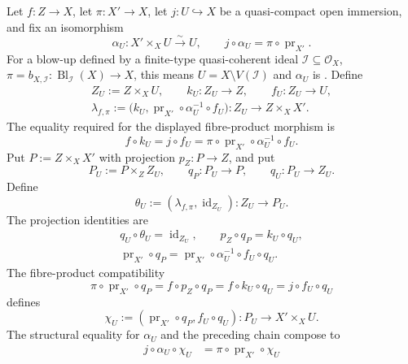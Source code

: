 \begin{definition}
  \label{def:nagata-strict-transform}
  \lean{}

  Let $f\colon Z\to X$, let $\pi\colon X'\to X$, let
  $j\colon U\hookrightarrow X$ be a quasi-compact open immersion, and fix
  an isomorphism
  \[
    \alpha_U\colon X'\times_XU\xrightarrow{\sim}U,\qquad
    j\circ\alpha_U=\pi\circ\operatorname{pr}_{X'}.
  \]
  For a blow-up defined by a finite-type quasi-coherent ideal
  $\mathcal I\subseteq\mathcal O_X$,
  $\pi=b_{X,\mathcal I}\colon\operatorname{Bl}_{\mathcal I}(X)\to X$, this
  means $U=X\setminus V(\mathcal I)$ and $\alpha_U$ is
  .  Define
  \[
  \begin{gathered}
    Z_U:=Z\times_XU,\qquad
    k_U\colon Z_U\longrightarrow Z,\qquad
    f_U\colon Z_U\longrightarrow U,\\
    \lambda_{f,\pi}
      :=\bigl(k_U,
        \operatorname{pr}_{X'}\circ\alpha_U^{-1}\circ f_U\bigr)
      \colon Z_U\longrightarrow Z\times_XX'.
  \end{gathered}
  \]
  The equality required for the displayed fibre-product morphism is
  \[
    f\circ k_U
      =j\circ f_U
      =\pi\circ\operatorname{pr}_{X'}\circ\alpha_U^{-1}\circ f_U.
  \]
  Put $P:=Z\times_XX'$ with projection
  $p_Z\colon P\to Z$, and put
  \[
    P_U:=P\times_ZZ_U,
    \qquad
    q_P\colon P_U\to P,
    \qquad
    q_U\colon P_U\to Z_U.
  \]
  Define
  \[
    \theta_U:=(\lambda_{f,\pi},\operatorname{id}_{Z_U})
      \colon Z_U\longrightarrow P_U.
  \]
  The projection identities are
  \[
  \begin{gathered}
    q_U\circ\theta_U=\operatorname{id}_{Z_U},
    \qquad
    p_Z\circ q_P=k_U\circ q_U,\\
    \operatorname{pr}_{X'}\circ q_P
      =\operatorname{pr}_{X'}\circ\alpha_U^{-1}\circ f_U\circ q_U.
  \end{gathered}
  \]
  The fibre-product compatibility
  \[
    \pi\circ\operatorname{pr}_{X'}\circ q_P
      =f\circ p_Z\circ q_P
      =f\circ k_U\circ q_U
      =j\circ f_U\circ q_U
  \]
  defines
  \[
    \chi_U:=
      (\operatorname{pr}_{X'}\circ q_P,f_U\circ q_U)
      \colon P_U\longrightarrow X'\times_XU.
  \]
  The structural equality for $\alpha_U$ and the preceding chain compose to
  \[
  \begin{aligned}
    j\circ\alpha_U\circ\chi_U
      &=\pi\circ\operatorname{pr}_{X'}\circ\chi_U\\

\end{aligned}\]
\end{definition}
